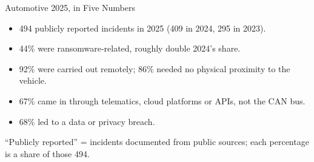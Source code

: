 \begin{frame}{Automotive 2025, in Five Numbers}
  \begin{itemize}
    \item \alert{494} publicly reported incidents in 2025 (409 in 2024, 295 in 2023).
    \item \alert{44\%} were ransomware-related, roughly double 2024's share.
    \item \alert{92\%} were carried out remotely; \alert{86\%} needed no physical proximity to the vehicle.
    \item \alert{67\%} came in through telematics, cloud platforms or APIs, not the CAN bus.
    \item \alert{68\%} led to a data or privacy breach.
  \end{itemize}
  \vspace{1mm}
  {\scriptsize ``Publicly reported'' = incidents documented from public sources; each percentage is a share of those 494.}
\end{frame}
